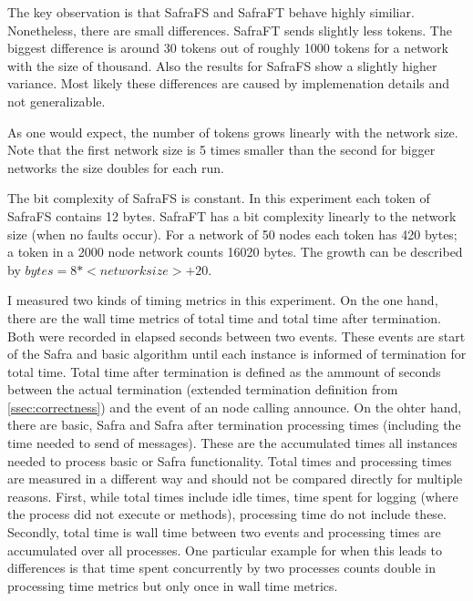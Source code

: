 The key observation is that SafraFS and SafraFT behave highly similiar.
Nonetheless, there are small differences.
SafraFT sends slightly less tokens.
The biggest difference is around 30 tokens out of roughly 1000 tokens for a network with the size of thousand.
Also the results for SafraFS show a slightly higher variance.
Most likely these differences are caused by implemenation details and not generalizable.

As one would expect, the number of tokens grows linearly with the network size.
Note that the first network size is 5 times smaller than the second for bigger networks the  size doubles for each run.

The bit complexity of SafraFS is constant.
In this experiment each token of SafraFS contains 12 bytes.
SafraFT has a bit complexity linearly to the network size (when no faults occur).
For a network of 50 nodes each token has 420 bytes; a token in a 2000 node network counts 16020 bytes.
The growth can be described by $bytes = 8 * <network size> + 20$.

I measured two kinds of timing metrics in this experiment.
On the one hand, there are the wall time metrics of total time and total time after termination.
Both were recorded in elapsed seconds between two events. 
These events are start of the Safra and basic algorithm until each instance is informed of termination for total time. 
Total time after termination is defined as the ammount of seconds between the actual termination (extended termination definition from \cref{ssec:correctness}) and the event of an node calling
announce. %
On the ohter hand, there are basic, Safra and Safra after termination processing times (including the time needed to send of messages).
These are the accumulated times all instances needed to process basic or Safra functionality.
Total times and processing times are measured in a different way and should not be compared directly for multiple reasons. 
First, while total times include idle times, time spent for logging (where the process did not execute or methods), processing time do not include these.
Secondly, total time is wall time between two events and processing times are accumulated over all processes. 
One particular example for when this leads to differences is that time spent concurrently by two processes counts double in processing time metrics but only once in wall time metrics.

